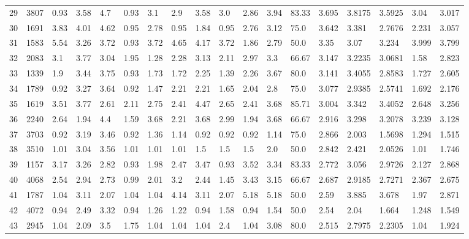 \documentclass[landscape, 10pt]{report}
\begin{document}
\begin{longtable}{l || l || l | l | l | l | l | l | l | l | l | l | l || l | l | l | l | l}
\rowcolor{lightgray}29 & 3807 & 0.93 & 3.58 & 4.7 & 0.93 & 3.1 & 2.9 & 3.58 & 3.0 & 2.86 & 3.94 & 83.33 & 3.695 & 3.8175 & 3.5925 & 3.04 & 3.017\\ 
30 & 1691 & 3.83 & 4.01 & 4.62 & 0.95 & 2.78 & 0.95 & 1.84 & 0.95 & 2.76 & 3.12 & 75.0 & 3.642 & 3.381 & 2.7676 & 2.231 & 3.057\\ 
\rowcolor{lightgray}31 & 1583 & 5.54 & 3.26 & 3.72 & 0.93 & 3.72 & 4.65 & 4.17 & 3.72 & 1.86 & 2.79 & 50.0 & 3.35 & 3.07 & 3.234 & 3.999 & 3.799\\ 
32 & 2083 & 3.1 & 3.77 & 3.04 & 1.95 & 1.28 & 2.28 & 3.13 & 2.11 & 2.97 & 3.3 & 66.67 & 3.147 & 3.2235 & 3.0681 & 1.58 & 2.823\\ 
\rowcolor{lightgray}33 & 1339 & 1.9 & 3.44 & 3.75 & 0.93 & 1.73 & 1.72 & 2.25 & 1.39 & 2.26 & 3.67 & 80.0 & 3.141 & 3.4055 & 2.8583 & 1.727 & 2.605\\ 
34 & 1789 & 0.92 & 3.27 & 3.64 & 0.92 & 1.47 & 2.21 & 2.21 & 1.65 & 2.04 & 2.8 & 75.0 & 3.077 & 2.9385 & 2.5741 & 1.692 & 2.176\\ 
\rowcolor{lightgray}35 & 1619 & 3.51 & 3.77 & 2.61 & 2.11 & 2.75 & 2.41 & 4.47 & 2.65 & 2.41 & 3.68 & 85.71 & 3.004 & 3.342 & 3.4052 & 2.648 & 3.256\\ 
36 & 2240 & 2.64 & 1.94 & 4.4 & 1.59 & 3.68 & 2.21 & 3.68 & 2.99 & 1.94 & 3.68 & 66.67 & 2.916 & 3.298 & 3.2078 & 3.239 & 3.128\\ 
\rowcolor{lightgray}37 & 3703 & 0.92 & 3.19 & 3.46 & 0.92 & 1.36 & 1.14 & 0.92 & 0.92 & 0.92 & 1.14 & 75.0 & 2.866 & 2.003 & 1.5698 & 1.294 & 1.515\\ 
38 & 3510 & 1.01 & 3.04 & 3.56 & 1.01 & 1.01 & 1.01 & 1.5 & 1.5 & 1.5 & 2.0 & 50.0 & 2.842 & 2.421 & 2.0526 & 1.01 & 1.746\\ 
\rowcolor{lightgray}39 & 1157 & 3.17 & 3.26 & 2.82 & 0.93 & 1.98 & 2.47 & 3.47 & 0.93 & 3.52 & 3.34 & 83.33 & 2.772 & 3.056 & 2.9726 & 2.127 & 2.868\\ 
40 & 4068 & 2.54 & 2.94 & 2.73 & 0.99 & 2.01 & 3.2 & 2.44 & 1.45 & 3.43 & 3.15 & 66.67 & 2.687 & 2.9185 & 2.7271 & 2.367 & 2.675\\ 
\rowcolor{lightgray}41 & 1787 & 1.04 & 3.11 & 2.07 & 1.04 & 1.04 & 4.14 & 3.11 & 2.07 & 5.18 & 5.18 & 50.0 & 2.59 & 3.885 & 3.678 & 1.97 & 2.871\\ 
42 & 4072 & 0.94 & 2.49 & 3.32 & 0.94 & 1.26 & 1.22 & 0.94 & 1.58 & 0.94 & 1.54 & 50.0 & 2.54 & 2.04 & 1.664 & 1.248 & 1.549\\ 
\rowcolor{lightgray}43 & 2945 & 1.04 & 2.09 & 3.5 & 1.75 & 1.04 & 1.04 & 1.04 & 2.4 & 1.04 & 3.08 & 80.0 & 2.515 & 2.7975 & 2.2305 & 1.04 & 1.924\\ 

\end{longtable}
\end{document}
